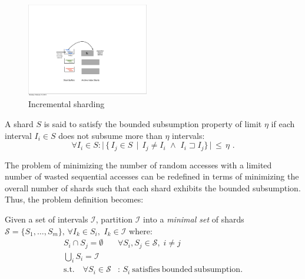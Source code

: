 \begin{figure}[tb]
	\centering
		\includegraphics[width=0.475\textwidth]{resources/inc_sharding.pdf}
	\caption{Incremental sharding}
	 \label{fig:inc_sharding}
\end{figure}


\begin{definition}
A shard $S$ is said to satisfy the bounded subsumption property of limit $\eta$ if each interval $I_i \in S$ does not subsume more than $\eta $ intervals:
$$ \forall I_i \in S: \vert \,\{ \, I_j \in S \, \mid \, I_j \neq I_i \,\, \wedge \,\, I_i \sqsupset I_j \} \,\vert \,\leq \, \eta  \,\,.
$$\end{definition}

The problem of minimizing the number of random accesses with a limited number of wasted sequential accesses can be redefined in terms of minimizing the overall number of shards such that each shard exhibits the bounded subsumption. Thus, the problem definition becomes:

\begin{definition}
Given a set of intervals $\mathcal{I}$, partition $\mathcal{I}$ into a \emph{minimal set} of shards  $\mathcal{S} = \{S_1, \ldots, S_{m}\}, \, \forall I_k \in S_{i}, \,\, I_k \in \mathcal{I}$ where:
\begin{eqnarray*}
	S_i \cap S_j = \emptyset & \forall S_i, S_j \in \mathcal{S}, \; i \neq j \\
	\bigcup_{i}{S_i} =  \mathcal{I} & \\
	\mathrm{s.t.}\quad \forall S_i \in \mathcal{S} &:\,S_i \mathrm{~satisfies~bounded~subsumption}.
\end{eqnarray*}
\end{definition}

